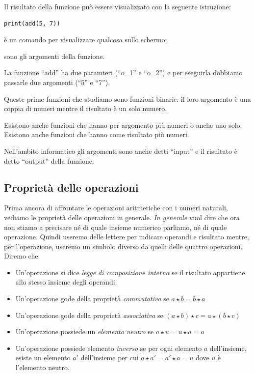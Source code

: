 Il risultato della funzione può essere visualizzato con la seguente 
istruzione:
\begin{lstlisting}
print(add(5, 7))
\end{lstlisting}
\begin{description} [noitemsep]
\item [\textbf{``print''}] è un comando per visualizzare qualcosa sullo 
schermo;
\item [\textbf{``5'' e ``7''}] sono gli argomenti della funzione. 
\end{description}
La funzione ``add'' ha due paramteri (``o\_1'' e ``o\_2'') e per eseguirla
dobbiamo passarle due argomenti (``5'' e ``7'').

\begin{osservazione}
Queste prime funzioni che studiamo sono funzioni binarie: il loro argomento è
una coppia di numeri mentre il risultato è un solo numero.

Esistono anche funzioni che hanno per argomento più numeri o anche uno solo.
Esistono anche funzioni che hanno come risultato più numeri.
\end{osservazione}

\begin{osservazione}
Nell'ambito informatico gli argomenti sono anche detti ``input'' e il 
risultato è detto ``output'' della funzione.
\end{osservazione}

\subsection{Proprietà delle operazioni}

Prima ancora di affrontare le operazioni aritmetiche con i numeri naturali, 
vediamo le proprietà delle operazioni in generale. \emph{In generale} vuol 
dire che ora non stiamo a precisare né di quale insieme numerico parliamo, 
né di quale operazione. Quindi useremo delle lettere per indicare  
operandi e  risultato mentre, per l'operazione, useremo un simbolo diverso 
da quelli delle quattro operazioni. Diremo che:

\begin{itemize} [noitemsep]
 \item Un'operazione si dice \emph{legge di composizione interna} se
  il risultato appartiene allo stesso insieme degli operandi.
 \item Un'operazione gode della proprietà \emph{commutativa} se 
  \(a \star b = b \star a\)
 \item Un'operazione gode della proprietà \emph{associativa} se 
  \((a \star b) \star c = a \star (b \star c)\)
 \item Un'operazione possiede un \emph{elemento neutro} se 
  \(a \star u = u \star a = a\)
 \item Un'operazione possiede elemento \emph{inverso} se per ogni
  elemento \(a\) dell'insieme, esiste un elemento \(a'\) 
  dell'insieme per cui \(a \star a' = a' \star a = u\) dove \(u\) è 
  l'elemento neutro.
\end{itemize}

